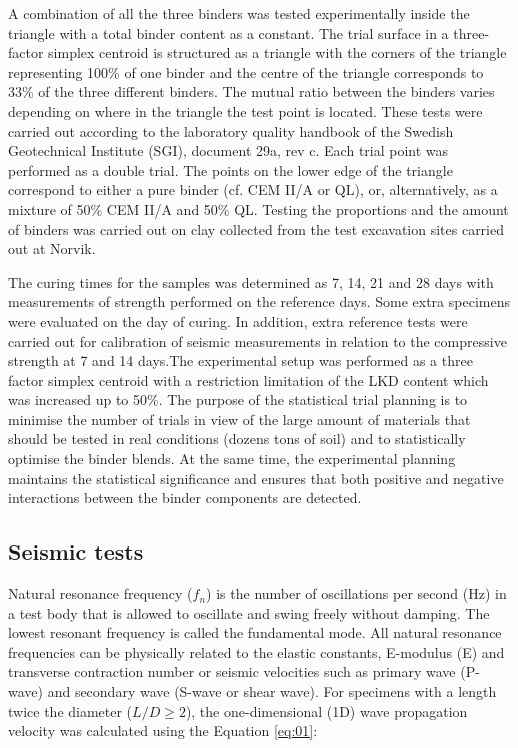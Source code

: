 \documentclass[final,3p,times,onecolumn,authoryear]{elsarticle}
\begin{document}
A combination of all the three binders was tested experimentally inside the triangle with a total binder content as a constant. The trial surface in a three-factor simplex centroid is structured as a triangle with the corners of the triangle representing 100\% of one binder and the centre of the triangle corresponds to 33\% of the three different binders. The mutual ratio between the binders varies depending on where in the triangle the test point is located. These tests were carried out according to the laboratory quality handbook of the Swedish Geotechnical Institute (SGI), document 29a, rev c. Each trial point was performed as a double trial. The points on the lower edge of the triangle correspond to either a pure binder (cf. CEM II/A or QL), or, alternatively, as a mixture of 50\% CEM II/A and 50\% QL. Testing the proportions and the amount of binders was carried out on clay collected from the test excavation sites carried out at Norvik. 

The curing times for the samples was determined as 7, 14, 21 and 28 days with measurements of strength performed on the reference days. Some extra specimens were evaluated on the  day of curing. In addition, extra reference tests were carried out  for calibration of seismic measurements in relation to the compressive strength at 7 and 14 days.The experimental setup was performed as a three factor simplex centroid with a restriction limitation of the LKD content which was increased up to 50\%. The purpose of the statistical trial planning is to minimise the number of trials in view of the large amount of materials that should be tested in real conditions (dozens tons of soil) and to statistically optimise the binder blends. At the same time, the experimental planning maintains the statistical significance and ensures that both positive and negative interactions between the binder components are detected. 

\subsection{Seismic tests}

Natural resonance frequency ($f_n$) is the number of oscillations per second (Hz) in a test body that is allowed to oscillate and swing freely without damping. The lowest resonant frequency is called the fundamental mode. All natural resonance frequencies can be physically related to the elastic constants, E-modulus (E) and transverse contraction number or seismic velocities such as primary wave (P-wave) and secondary wave (S-wave or shear wave). For specimens with a length twice the diameter ($L/D\geq2$), the one-dimensional (1D) wave propagation velocity was calculated using the Equation \ref{eq:01}:
\end{document}
